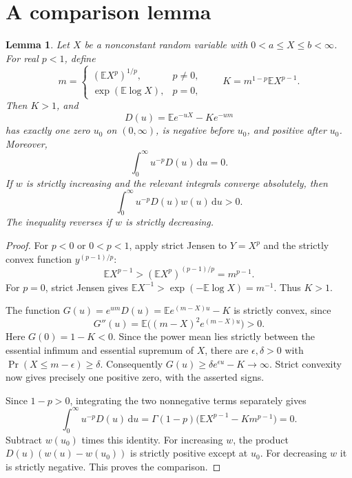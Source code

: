 \documentclass[11pt]{article}
\newtheorem{lemma}{Lemma}
\newcommand{\E}{\mathbb E}
\newcommand{\dd}{\,\mathrm d}
\begin{document}
\section*{A comparison lemma}
\begin{lemma}\label{lem:crossing}
Let $X$ be a nonconstant random variable with $0<a\le X\le b<\infty$.
For real $p<1$, define
\[
m=\begin{cases}(\E X^p)^{1/p},&p\ne0,\\
\exp(\E\log X),&p=0,\end{cases}
\qquad K=m^{1-p}\E X^{p-1}.
\]
Then $K>1$, and
\[
D(u)=\E e^{-uX}-K e^{-um}
\]
has exactly one zero $u_0$ on $(0,\infty)$, is negative before $u_0$,
and positive after $u_0$. Moreover,
\begin{equation}\label{eq:zero-moment}
\int_0^\infty u^{-p}D(u)\dd u=0.
\end{equation}
If $w$ is strictly increasing and the relevant integrals converge
absolutely, then
\[
\int_0^\infty u^{-p}D(u)w(u)\dd u>0.
\]
The inequality reverses if $w$ is strictly decreasing.
\end{lemma}
\begin{proof}
For $p<0$ or $0<p<1$, apply strict Jensen to $Y=X^p$ and
the strictly convex function $y^{(p-1)/p}$:
\[
\E X^{p-1}>(\E X^p)^{(p-1)/p}=m^{p-1}.
\]
For $p=0$, strict Jensen gives
$\E X^{-1}>\exp(-\E\log X)=m^{-1}$. Thus $K>1$.

The function $G(u)=e^{um}D(u)=\E e^{(m-X)u}-K$ is strictly
convex, since
\[
G''(u)=\E\bigl((m-X)^2e^{(m-X)u}\bigr)>0.
\]
Here $G(0)=1-K<0$. Since the power mean lies strictly between the
essential infimum and essential supremum of $X$, there are
$\epsilon,\delta>0$ with $\Pr(X\le m-\epsilon)\ge\delta$.
Consequently $G(u)\ge\delta e^{\epsilon u}-K\to\infty$.
Strict convexity now gives precisely one positive zero, with the
asserted signs.

Since $1-p>0$, integrating the two nonnegative terms separately gives
\[
\int_0^\infty u^{-p}D(u)\dd u
=\Gamma(1-p)\bigl(\E X^{p-1}-Km^{p-1}\bigr)=0.
\]
Subtract $w(u_0)$ times this identity. For increasing $w$, the product
$D(u)(w(u)-w(u_0))$ is strictly positive except at $u_0$.
For decreasing $w$ it is strictly negative. This proves the comparison.
\end{proof}
\end{document}
